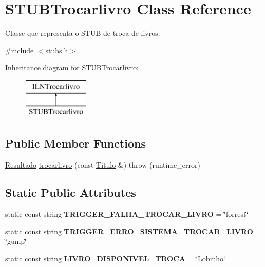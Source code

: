 \hypertarget{classSTUBTrocarlivro}{}\section{S\+T\+U\+B\+Trocarlivro Class Reference}
\label{classSTUBTrocarlivro}


Classe que representa o S\+T\+UB de troca de livros.  




{\ttfamily \#include $<$stubs.\+h$>$}

Inheritance diagram for S\+T\+U\+B\+Trocarlivro\+:\begin{figure}[H]
\begin{center}
\leavevmode
\includegraphics[height=2.000000cm]{classSTUBTrocarlivro}
\end{center}
\end{figure}
\subsection*{Public Member Functions}
\begin{DoxyCompactItemize}
\item 
\hyperlink{classResultado}{Resultado} \hyperlink{classSTUBTrocarlivro_ac94fcf8594839d0edff8f2c9ab556d21}{trocarlivro} (const \hyperlink{classTitulo}{Titulo} \&)  throw (runtime\+\_\+error)
\end{DoxyCompactItemize}
\subsection*{Static Public Attributes}
\begin{DoxyCompactItemize}
\item 
\mbox{\label{classSTUBTrocarlivro_a6971aeacf6543cbea47bb134aa71a396}} 
static const string {\bfseries T\+R\+I\+G\+G\+E\+R\+\_\+\+F\+A\+L\+H\+A\+\_\+\+T\+R\+O\+C\+A\+R\+\_\+\+L\+I\+V\+RO} = \char`\"{}forrest\char`\"{}
\item 
\mbox{\label{classSTUBTrocarlivro_a84a662aa66292900dd8a3eb176653516}} 
static const string {\bfseries T\+R\+I\+G\+G\+E\+R\+\_\+\+E\+R\+R\+O\+\_\+\+S\+I\+S\+T\+E\+M\+A\+\_\+\+T\+R\+O\+C\+A\+R\+\_\+\+L\+I\+V\+RO} = \char`\"{}gump\char`\"{}
\item 
\mbox{\label{classSTUBTrocarlivro_a8052c570d33fcb70e9ec015515deb5fd}} 
static const string {\bfseries L\+I\+V\+R\+O\+\_\+\+D\+I\+S\+P\+O\+N\+I\+V\+E\+L\+\_\+\+T\+R\+O\+CA} = \char`\"{}Lobinho\char`\"{}
\end{DoxyCompactItemize}


